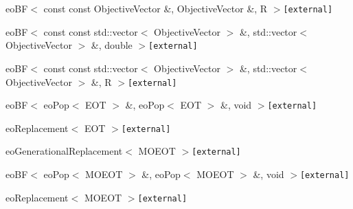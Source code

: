 \begin{CompactList}
\begin{CompactList}
\item eo\-BF$<$ const const Objective\-Vector \&, Objective\-Vector \&, R $>${\tt  [external]}\begin{CompactList}
\item {}
\end{CompactList}
\item eo\-BF$<$ const const std::vector$<$ Objective\-Vector $>$ \&, std::vector$<$ Objective\-Vector $>$ \&, double $>${\tt  [external]}\begin{CompactList}
\item {}
\end{CompactList}
\item eo\-BF$<$ const const std::vector$<$ Objective\-Vector $>$ \&, std::vector$<$ Objective\-Vector $>$ \&, R $>${\tt  [external]}\begin{CompactList}
\item {}
\end{CompactList}
\item eo\-BF$<$ eo\-Pop$<$ EOT $>$ \&, eo\-Pop$<$ EOT $>$ \&, void $>${\tt  [external]}\begin{CompactList}
\item eo\-Replacement$<$ EOT $>${\tt  [external]}\begin{CompactList}
\item eo\-Generational\-Replacement$<$ MOEOT $>${\tt  [external]}\begin{CompactList}
\item {}
\end{CompactList}
\end{CompactList}
\end{CompactList}
\item eo\-BF$<$ eo\-Pop$<$ MOEOT $>$ \&, eo\-Pop$<$ MOEOT $>$ \&, void $>${\tt  [external]}\begin{CompactList}
\item eo\-Replacement$<$ MOEOT $>${\tt  [external]}\begin{CompactList}

\end{CompactList}
\end{CompactList}
\end{CompactList}
\end{CompactList}
